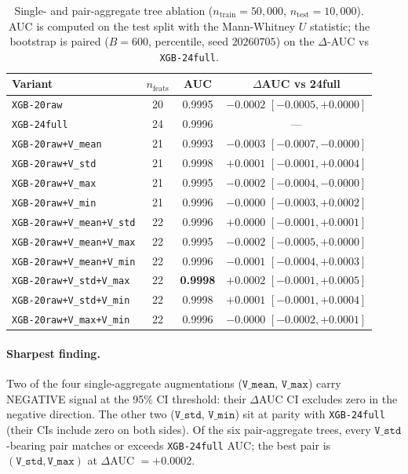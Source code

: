 \documentclass{article}
\begin{document}
\begin{table}[t]
\centering\small
\caption{Single- and pair-aggregate tree ablation ($n_{\text{train}}{=}50{,}000$,
$n_{\text{test}}{=}10{,}000$). AUC is computed on the test split with the
Mann-Whitney $U$ statistic; the bootstrap is paired ($B{=}600$, percentile,
seed $20260705$) on the $\Delta$-AUC vs \texttt{XGB-24full}.}
\label{tab:p8-single-sensor}
\begin{tabular}{lccc}
\toprule
Variant & $n_{\text{feats}}$ & AUC & $\Delta$AUC vs 24full \\
\midrule
\texttt{XGB-20raw}                 & 20 & 0.9995 & $-0.0002$ $[-0.0005,+0.0000]$ \\
\texttt{XGB-24full}                & 24 & 0.9996 & ---                    \\
\texttt{XGB-20raw+V\_mean}         & 21 & 0.9993 & $\mathbf{-0.0003}$ $\mathbf{[-0.0007,-0.0000]}$ \\
\texttt{XGB-20raw+V\_std}          & 21 & 0.9998 & $+0.0001$ $[-0.0001,+0.0004]$ \\
\texttt{XGB-20raw+V\_max}          & 21 & 0.9995 & $\mathbf{-0.0002}$ $\mathbf{[-0.0004,-0.0000]}$ \\
\texttt{XGB-20raw+V\_min}          & 21 & 0.9996 & $-0.0000$ $[-0.0003,+0.0002]$ \\
\texttt{XGB-20raw+V\_mean+V\_std}  & 22 & 0.9996 & $+0.0000$ $[-0.0001,+0.0001]$ \\
\texttt{XGB-20raw+V\_mean+V\_max}  & 22 & 0.9995 & $-0.0002$ $[-0.0005,+0.0000]$ \\
\texttt{XGB-20raw+V\_mean+V\_min}  & 22 & 0.9996 & $-0.0001$ $[-0.0004,+0.0003]$ \\
\texttt{XGB-20raw+V\_std+V\_max}   & 22 & \textbf{0.9998} & $+0.0002$ $[-0.0001,+0.0005]$ \\
\texttt{XGB-20raw+V\_std+V\_min}   & 22 & 0.9998 & $+0.0001$ $[-0.0001,+0.0004]$ \\
\texttt{XGB-20raw+V\_max+V\_min}   & 22 & 0.9996 & $-0.0000$ $[-0.0002,+0.0001]$ \\
\bottomrule
\end{tabular}
\end{table}

\paragraph{Sharpest finding.}
Two of the four single-aggregate augmentations ($\texttt{V\_mean}$,
$\texttt{V\_max}$) carry NEGATIVE signal at the 95\% CI threshold:
their $\Delta$AUC CI excludes zero in the negative direction. The
other two ($\texttt{V\_std}$, $\texttt{V\_min}$) sit at parity with
\texttt{XGB-24full} (their CIs include zero on both sides). Of the
six pair-aggregate trees, every $\texttt{V\_std}$-bearing pair matches
or exceeds \texttt{XGB-24full} AUC; the best pair is
$(\texttt{V\_std}, \texttt{V\_max})$ at $\Delta$AUC $= +0.0002$.
\end{document}
